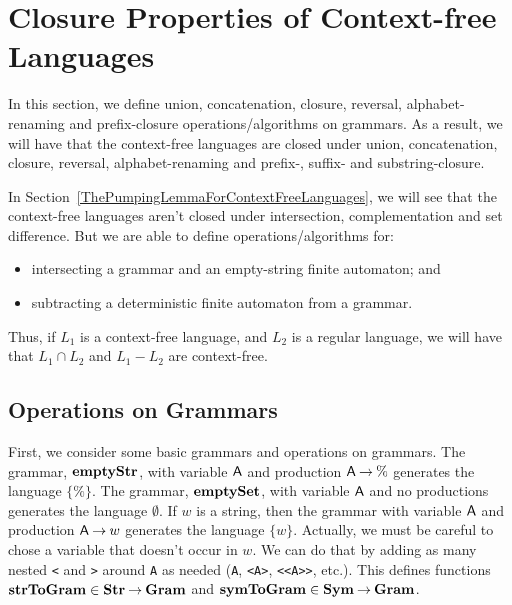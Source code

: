 \section{Closure Properties of Context-free Languages}
\label{ClosurePropertiesOfContextFreeLanguages}

%
In this section, we define union, concatenation, closure, reversal,
alphabet-renaming and prefix-closure operations/algorithms on
grammars.  As a result, we will have that the context-free languages
are closed under union, concatenation, closure, reversal,
alphabet-renaming and prefix-, suffix- and substring-closure.

In Section~\ref{ThePumpingLemmaForContextFreeLanguages}, we
will see that the context-free languages aren't closed under
intersection, complementation and set difference.
But we are able to define operations/algorithms for:
\begin{itemize}
\item intersecting a grammar and an empty-string finite automaton; and

\item subtracting a deterministic finite automaton from a grammar.
\end{itemize}
Thus, if $L_1$ is a context-free language, and $L_2$ is a regular
language, we will have that $L_1\cap L_2$ and $L_1-L_2$ are
context-free.

\subsection{Operations on Grammars}

First, we consider some basic grammars and operations on grammars.
The grammar, $\mathbf{emptyStr}$, with variable $\mathsf{A}$ and production
%
$\mathsf{A}\mathbin{\to}\%$ generates the language $\{\%\}$.  The grammar,
$\mathbf{emptySet}$, with variable $\mathsf{A}$ and no productions generates the
%
language $\emptyset$.  If $w$ is a string, then the grammar with
variable $\mathsf{A}$ and production $\mathsf{A}\mathbin{\to} w$ generates the language
$\{w\}$.  Actually, we must be careful to chose a variable that
doesn't occur in $w$. We can do that by adding as many nested
\texttt{<} and \texttt{>} around \texttt{A} as needed (\texttt{A},
\texttt{<A>}, \texttt{<<A>>}, etc.). This defines functions
$\mathbf{strToGram}\in\mathbf{Str}\mathbin{\to}\mathbf{Gram}$ and $\mathbf{symToGram}\in\mathbf{Sym}\mathbin{\to}\mathbf{Gram}$.
%
%

